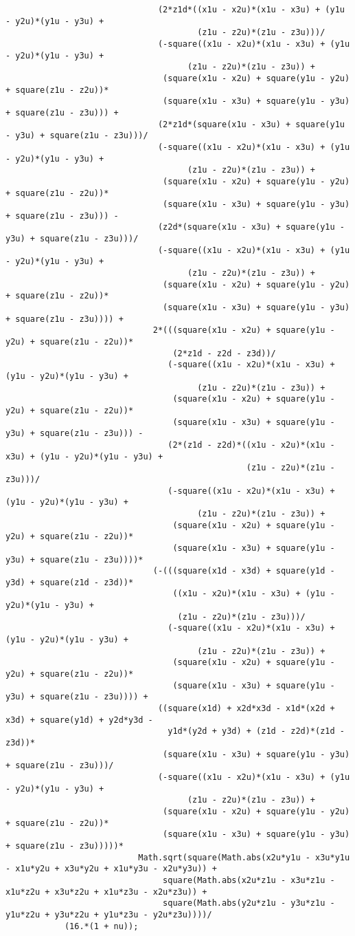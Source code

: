 \begin{lstlisting}
							   (2*z1d*((x1u - x2u)*(x1u - x3u) + (y1u - y2u)*(y1u - y3u) + 
									   (z1u - z2u)*(z1u - z3u)))/
							   (-square((x1u - x2u)*(x1u - x3u) + (y1u - y2u)*(y1u - y3u) + 
									 (z1u - z2u)*(z1u - z3u)) + 
								(square(x1u - x2u) + square(y1u - y2u) + square(z1u - z2u))*
								(square(x1u - x3u) + square(y1u - y3u) + square(z1u - z3u))) + 
							   (2*z1d*(square(x1u - x3u) + square(y1u - y3u) + square(z1u - z3u)))/
							   (-square((x1u - x2u)*(x1u - x3u) + (y1u - y2u)*(y1u - y3u) + 
									 (z1u - z2u)*(z1u - z3u)) + 
								(square(x1u - x2u) + square(y1u - y2u) + square(z1u - z2u))*
								(square(x1u - x3u) + square(y1u - y3u) + square(z1u - z3u))) - 
							   (z2d*(square(x1u - x3u) + square(y1u - y3u) + square(z1u - z3u)))/
							   (-square((x1u - x2u)*(x1u - x3u) + (y1u - y2u)*(y1u - y3u) + 
									 (z1u - z2u)*(z1u - z3u)) + 
								(square(x1u - x2u) + square(y1u - y2u) + square(z1u - z2u))*
								(square(x1u - x3u) + square(y1u - y3u) + square(z1u - z3u)))) + 
							  2*(((square(x1u - x2u) + square(y1u - y2u) + square(z1u - z2u))*
								  (2*z1d - z2d - z3d))/
								 (-square((x1u - x2u)*(x1u - x3u) + (y1u - y2u)*(y1u - y3u) + 
									   (z1u - z2u)*(z1u - z3u)) + 
								  (square(x1u - x2u) + square(y1u - y2u) + square(z1u - z2u))*
								  (square(x1u - x3u) + square(y1u - y3u) + square(z1u - z3u))) - 
								 (2*(z1d - z2d)*((x1u - x2u)*(x1u - x3u) + (y1u - y2u)*(y1u - y3u) + 
												 (z1u - z2u)*(z1u - z3u)))/
								 (-square((x1u - x2u)*(x1u - x3u) + (y1u - y2u)*(y1u - y3u) + 
									   (z1u - z2u)*(z1u - z3u)) + 
								  (square(x1u - x2u) + square(y1u - y2u) + square(z1u - z2u))*
								  (square(x1u - x3u) + square(y1u - y3u) + square(z1u - z3u))))*
							  (-(((square(x1d - x3d) + square(y1d - y3d) + square(z1d - z3d))*
								  ((x1u - x2u)*(x1u - x3u) + (y1u - y2u)*(y1u - y3u) + 
								   (z1u - z2u)*(z1u - z3u)))/
								 (-square((x1u - x2u)*(x1u - x3u) + (y1u - y2u)*(y1u - y3u) + 
									   (z1u - z2u)*(z1u - z3u)) + 
								  (square(x1u - x2u) + square(y1u - y2u) + square(z1u - z2u))*
								  (square(x1u - x3u) + square(y1u - y3u) + square(z1u - z3u)))) + 
							   ((square(x1d) + x2d*x3d - x1d*(x2d + x3d) + square(y1d) + y2d*y3d - 
								 y1d*(y2d + y3d) + (z1d - z2d)*(z1d - z3d))*
								(square(x1u - x3u) + square(y1u - y3u) + square(z1u - z3u)))/
							   (-square((x1u - x2u)*(x1u - x3u) + (y1u - y2u)*(y1u - y3u) + 
									 (z1u - z2u)*(z1u - z3u)) + 
								(square(x1u - x2u) + square(y1u - y2u) + square(z1u - z2u))*
								(square(x1u - x3u) + square(y1u - y3u) + square(z1u - z3u)))))*
						   Math.sqrt(square(Math.abs(x2u*y1u - x3u*y1u - x1u*y2u + x3u*y2u + x1u*y3u - x2u*y3u)) + 
								square(Math.abs(x2u*z1u - x3u*z1u - x1u*z2u + x3u*z2u + x1u*z3u - x2u*z3u)) + 
								square(Math.abs(y2u*z1u - y3u*z1u - y1u*z2u + y3u*z2u + y1u*z3u - y2u*z3u))))/
			(16.*(1 + nu));
			

\end{lstlisting}
